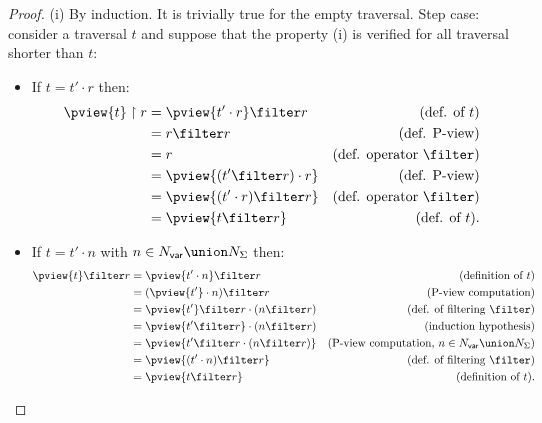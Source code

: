 \begin{proof}
(i) By induction. It is trivially true for the empty
traversal. Step case: consider a traversal $t$ and
suppose that the property (i) is verified for all traversal shorter
than $t$:
\begin{itemize}[-]
\item If $t = t' \cdot r$ then:
    \begin{align*}
    \pview{t} \upharpoonright  r
        &=  \pview{t' \cdot r } \filter  r       & (\mbox{def. of } t)\\
        &=  r \filter  r                         & (\mbox{def. P-view})\\
        &=  r                                                & (\mbox{def. operator $\filter$})\\
        &=  \pview{(t' \filter  r ) \cdot r }    & (\mbox{def. P-view})\\
        &=  \pview{(t' \cdot r)  \filter  r }    & (\mbox{def. operator $\filter$})\\
        &= \pview{t \filter  r }                & (\mbox{def. of } t).
    \end{align*}
\item If $t = t' \cdot n$ with $n \in N_{\sf var} \union N_{\Sigma}$ then:
    \begin{align*}
    \pview{t} \filter  r
&= \pview{t' \cdot n} \filter  r & (\mbox{definition of } t)\\
        &= (\pview{t'} \cdot n) \filter  r  & (\mbox{P-view computation}) \\
        &= \pview{t'} \filter  r  \cdot (n \filter  r)            & (\mbox{def. of filtering $\filter$}) \\
        &= \pview{t' \filter  r } \cdot (n \filter  r)           & (\mbox{induction hypothesis}) \\
        &= \pview{t' \filter  r \cdot (n \filter  r) } & (\mbox{P-view computation, $n \in N_{\sf var} \union N_{\Sigma}$}) \\
        &= \pview{(t' \cdot n ) \filter  r  }           & (\mbox{def. of filtering $\filter$}) \\
        &= \pview{t \filter  r  }
 & (\mbox{definition of } t).
    \end{align*}



\end{itemize}
\end{proof}
